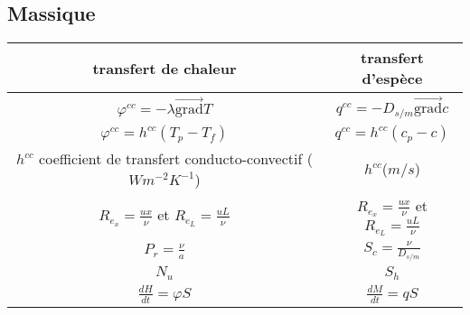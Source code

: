 \documentclass{article}
\begin{document}
\subsection{Massique}
\begin{tabular}{|c|c|}
\hline
transfert de chaleur & transfert d'esp\`ece \\
\hline
$\varphi^{cc}= - \lambda \vec{\mbox{grad}}T$ & $q^{cc}= - D_{s/m} \vec{\mbox{grad}}c $\\
\hline
$\varphi^{cc}=h^{cc}(T_p - T_f)$ & $q^{cc}=h^{cc}(c_p - c)$\\
\hline
$h^{cc}$ coefficient de transfert conducto-convectif ($Wm^{-2}K^{-1}$) & $h^{cc} $($m/s$) \\
\hline
$R_{e_x}=\frac{ux}{\nu}$ et $R_{e_L}=\frac{ uL}{\nu}$ & $R_{e_x}=\frac{ux}{\nu}$ et $R_{e_L}=\frac{ uL}{\nu}$ \\
\hline
$P_r=\frac{ \nu}{a} $& $S_c=\frac{\nu}{D_{s/m}} $\\
\hline
$N_u$ & $S_h $\\
\hline
$\frac{ dH}{dt}=\varphi S$ & $\frac{dM}{dt}=qS$\\
\hline
\end{tabular}
\end{document}
